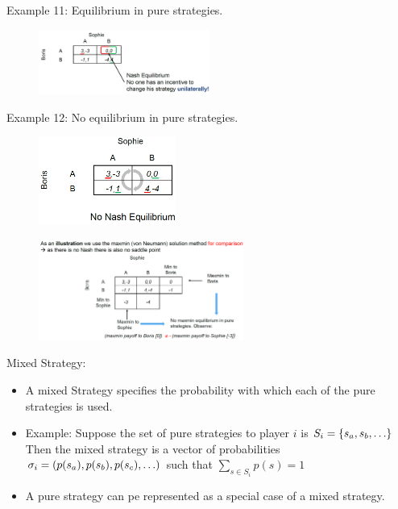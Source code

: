 Example 11: Equilibrium in pure strategies.

\begin{figure}[H]
    \centering
    \includegraphics[width=0.5\textwidth]{Pictures/nash_equilibrium_2.png}
\end{figure}

Example 12: No equilibrium in pure strategies.

\begin{figure}[H]
    \centering
    \includegraphics[width=0.4\textwidth]{Pictures/no_nash_equilibrium.png}
\end{figure}

\begin{figure}[H]
    \centering
    \includegraphics[width=0.6\textwidth]{Pictures/example_12_comment.png}
\end{figure}


Mixed Strategy:

\begin{itemize}
    \item A mixed Strategy specifies the probability with which each of the
        pure strategies is used.
    \item Example: Suppose the set of pure strategies to player $i$ is $S_i = \geschwungeneklammer{s_a,s_b,\dots}$
        Then the mixed strategy is a vector of probabilities
        $\sigma_i = \klammer{p(s_a) , p(s_b) , p(s_c) , \dots}$ such that
        $\sum_{s \in S_i} p(s) = 1$
    \item A pure strategy can pe represented as a special case of a mixed strategy.
\end{itemize}

